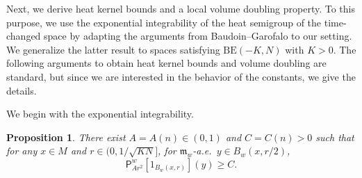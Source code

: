 \documentclass[10pt]{article}
\newcommand{\m}{\mathfrak{m}}
\newcommand{\M}{{\mathit{M}}}
\renewcommand{\P}{\mathsf{P}}
\newcommand{\One}{1}
\theoremstyle{plain}
\newtheorem{proposition}[theorem]{Proposition}
\theoremstyle{definition}
\begin{document}
Next, we derive heat kernel bounds and a local volume doubling property. To this purpose, we use the exponential integrability of the heat semigroup of the time-changed space by adapting the arguments from Baudoin--Garofalo \cite[Theorem 3.1]{BaudoinGarofalo} to our setting. We generalize the latter result to spaces satisfying $\mathrm{BE}(-K,N)$ with $K>0$. The following arguments to obtain heat kernel bounds and volume doubling are standard, but since we are interested in the behavior of the constants, we give the details. 

We begin with the exponential integrability.

\begin{proposition}\label{lem:exp}
There exist $A=A(n)\in(0,1)$ and $C=C(n)>0$ such that for any $x\in \M$ and $r\in(0,1/\sqrt{KN}]$, for $\m_w$-a.e.~$y\in B_w(x,r/2)$,
    \[
    \P_{Ar^2}^w [\One_{B_w(x,r)}](y)\geq C.
    \]

\end{proposition}
\end{document}
